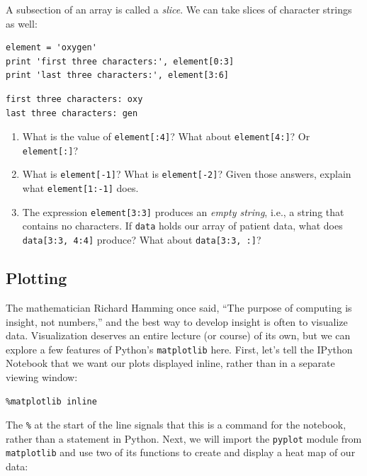 \documentclass[]{book}
\newcommand{\gdef}[2]{\emph{#2}}
\begin{document}
A subsection of an array is called a \gdef{g:slice}{slice}. We can
take slices of character strings as well:

\begin{verbatim}
element = 'oxygen'
print 'first three characters:', element[0:3]
print 'last three characters:', element[3:6]
\end{verbatim}

\begin{verbatim}
first three characters: oxy
last three characters: gen
\end{verbatim}

\begin{enumerate}
\item
  What is the value of \texttt{element{[}:4{]}}? What about
  \texttt{element{[}4:{]}}? Or \texttt{element{[}:{]}}?
\item
  What is \texttt{element{[}-1{]}}? What is \texttt{element{[}-2{]}}?
  Given those answers, explain what \texttt{element{[}1:-1{]}} does.
\item
  The expression \texttt{element{[}3:3{]}} produces an
  \gdef{g:empty-string}{empty string}, i.e., a string that contains
  no characters. If \texttt{data} holds our array of patient data, what
  does \texttt{data{[}3:3, 4:4{]}} produce? What about
  \texttt{data{[}3:3, :{]}}?
\end{enumerate}

\subsection{Plotting}

The mathematician Richard Hamming once said, ``The purpose of computing
is insight, not numbers,'' and the best way to develop insight is often
to visualize data. Visualization deserves an entire lecture (or course)
of its own, but we can explore a few features of Python's
\texttt{matplotlib} here. First, let's tell the IPython Notebook that we
want our plots displayed inline, rather than in a separate viewing
window:

\begin{verbatim}
%matplotlib inline
\end{verbatim}

The \texttt{\%} at the start of the line signals that this is a command
for the notebook, rather than a statement in Python. Next, we will
import the \texttt{pyplot} module from \texttt{matplotlib} and use two
of its functions to create and display a heat map of our data:
\end{document}
